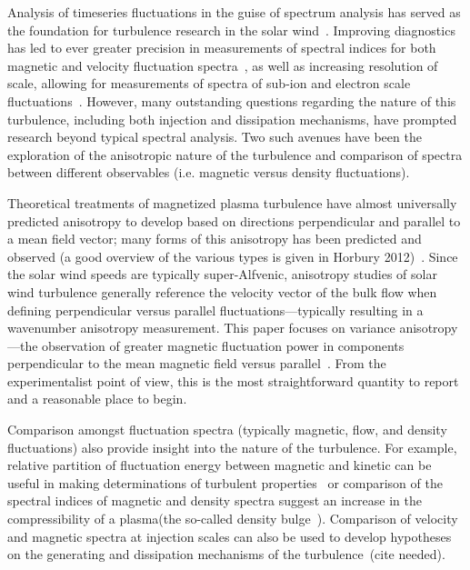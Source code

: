 \documentclass[aip,prl,amsmath,amssymb,reprint,superscriptaddress]{revtex4-1} %
\begin{document}
Analysis of timeseries fluctuations in the guise of spectrum analysis has served as the foundation for turbulence research in the solar wind~\cite{goldstein95,tumarsch95}. Improving diagnostics has led to ever greater precision in measurements of spectral indices for both magnetic and velocity fluctuation spectra~\cite{podesta07}, as well as increasing resolution of scale, allowing for measurements of spectra of sub-ion and electron scale fluctuations~\cite{alexandrova09,sahraoui09}. However, many outstanding questions regarding the nature of this turbulence, including both injection and dissipation mechanisms, have prompted research beyond typical spectral analysis. Two such avenues have been the exploration of the anisotropic nature of the turbulence and comparison of spectra between different observables (i.e. magnetic versus density fluctuations).

Theoretical treatments of magnetized plasma turbulence have almost universally predicted anisotropy to develop based on directions perpendicular and parallel to a mean field vector; many forms of this anisotropy has been predicted and observed (a good overview of the various types is given in Horbury 2012)~\cite{horbury12}. Since the solar wind speeds are typically super-Alfvenic, anisotropy studies of solar wind turbulence generally reference the velocity vector of the bulk flow when defining perpendicular versus parallel fluctuations---typically resulting in a wavenumber anisotropy measurement. This paper focuses on variance anisotropy---the observation of greater magnetic fluctuation power in components perpendicular to the mean magnetic field versus parallel~\cite{belcher71,smith06}. From the experimentalist point of view, this is the most straightforward quantity to report and a reasonable place to begin.

Comparison amongst fluctuation spectra (typically magnetic, flow, and density fluctuations) also provide insight into the nature of the turbulence. For example, relative partition of fluctuation energy between magnetic and kinetic can be useful in making determinations of turbulent properties~\cite{podesta07} or comparison of the spectral indices of magnetic and density spectra suggest an increase in the compressibility of a plasma(the so-called density bulge~\cite{harmon05}). Comparison of velocity and magnetic spectra at injection scales can also be used to develop hypotheses on the generating and dissipation mechanisms of the turbulence~\cite{}(cite needed).
\end{document}
